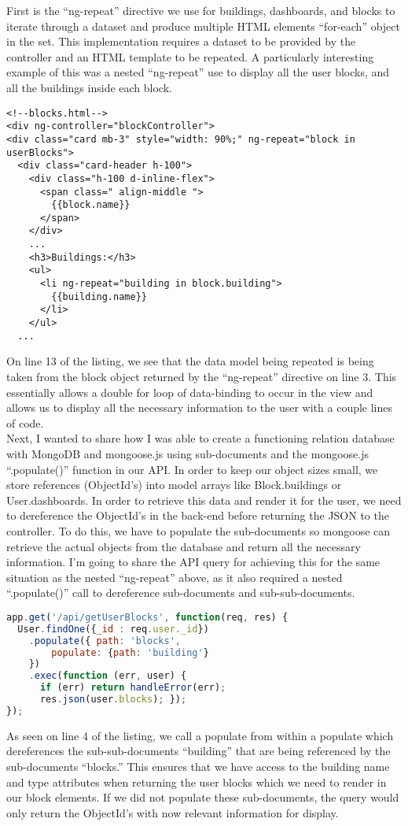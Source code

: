 \documentclass[letterpaper,10pt,serif,draftclsnofoot,onecolumn,compsoc,titlepage]{IEEEtran}
\begin{document}
\noindent First is the ``ng-repeat'' directive we use for buildings, dashboards, and blocks to iterate through a dataset and produce multiple HTML elements ``for-each'' object in the set. This implementation requires a dataset to be provided by the controller and an HTML template to be repeated. A particularly interesting example of this was a nested ``ng-repeat'' use to display all the user blocks, and all the buildings inside each block. 
\begin{lstlisting}[language=HTML5]
<!--blocks.html-->
<div ng-controller="blockController">
<div class="card mb-3" style="width: 90%;" ng-repeat="block in userBlocks">
  <div class="card-header h-100">
    <div class="h-100 d-inline-flex">
      <span class=" align-middle ">
        {{block.name}}
      </span>
    </div>
    ...
    <h3>Buildings:</h3>
    <ul>
      <li ng-repeat="building in block.building">
        {{building.name}}
      </li>
    </ul>
  ...
\end{lstlisting}
On line 13 of the listing, we see that the data model being repeated is being taken from the block object returned by the ``ng-repeat'' directive on line 3. This essentially allows a double for loop of data-binding to occur in the view and allows us to display all the necessary information to the user with a couple lines of code.\\

\noindent Next, I wanted to share how I was able to create a functioning relation database with MongoDB and mongoose.js using sub-documents and the mongoose.js ``.populate()'' function in our API. In order to keep our object sizes small, we store references (ObjectId's) into model arrays like Block.buildings or User.dashboards. In order to retrieve this data and render it for the user, we need to dereference the ObjectId's in the back-end before returning the JSON to the controller. To do this, we have to populate the sub-documents so mongoose can retrieve the actual objects from the database and return all the necessary information. I'm going to share the API query for achieving this for the same situation as the nested ``ng-repeat'' above, as it also required a nested ``.populate()'' call to dereference sub-documents and sub-sub-documents.
\begin{lstlisting}[language=JavaScript]
app.get('/api/getUserBlocks', function(req, res) {
  User.findOne({_id : req.user._id})
    .populate({ path: 'blocks',
        populate: {path: 'building'}
    })
    .exec(function (err, user) {
      if (err) return handleError(err);
      res.json(user.blocks); });
});
\end{lstlisting}
As seen on line 4 of the listing, we call a populate from within a populate which dereferences the sub-sub-documents ``building'' that are being referenced by the sub-documents ``blocks.'' This ensures that we have access to the building name and type attributes when returning the user blocks which we need to render in our block elements. If we did not populate these sub-documents, the query would only return the ObjectId's with now relevant information for display.\\
\end{document}
